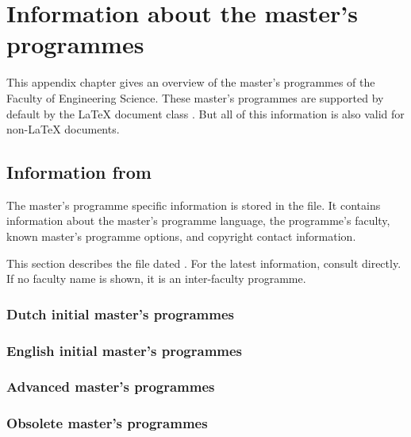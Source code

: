 \chapter{Information about the master's programmes}

\ReadConfigFile

This \ifanappendix appendix \else chapter \fi gives an overview of the master's
programmes of the Faculty of Engineering Science. These master's programmes are
supported by default by the LaTeX document class . But all of this
information is also valid for non-LaTeX documents.

\section{Information from \file{\ConfigFileName}}
\label{sec:mastercfg}
The master's programme specific information is stored in the
\file{\ConfigFileName} file. It contains information about the master's
programme language, the programme's faculty, known master's programme options,
and copyright contact information.

\ifdefined\microtypesetup {}\fi

This section describes the \file{\ConfigFileName} file dated
\PrintConfigFileDate. For the latest information, consult
\file{\ConfigFileName} directly.
If no faculty name is shown, it is an inter-faculty programme.

\subsection{Dutch initial master’s programmes}

\subsection{English initial master’s programmes}

\subsection{Advanced master’s programmes}

\subsection{Obsolete master’s programmes}
\label{sec:obsoletemasters}
\PrintMastersInfo*{}{}


